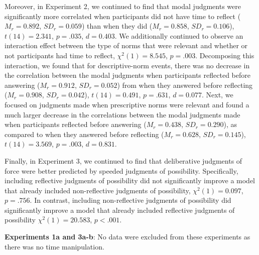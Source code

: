 \documentclass[11pt,letterpaper]{article}
\begin{document}
Moreover, in Experiment 2, we continued to find that modal judgments were significantly more correlated when participants did not have time to reflect ($M_{r} = 0.892$, $SD_{r} = 0.059$) than when they did ($M_{r} = 0.858$, $SD_{r} = 0.106$), $t(14) = 2.341$, $p  = .035$, $d = 0.403$. We additionally continued to observe an interaction effect between the type of norms that were relevant and whether or not participants had time to reflect, $\chi^2(1) = 8.545$, $p = .003$. Decomposing this interaction, we found that for descriptive-norm events, there was no decrease in the correlation between the modal judgments when participants reflected before answering ($M_{r} = 0.912$, $SD_{r} = 0.052$) from when they answered before reflecting ($M_{r} = 0.908$, $SD_{r} = 0.042$), $t(14) = 0.491$, $p  = .631$, $d = 0.077$. Next, we focused on judgments made when prescriptive norms were relevant and found a much larger decrease in the correlations between the modal judgments made when participants reflected before answering ($M_{r} = 0.438$, $SD_{r} = 0.290$), as compared to when they answered before reflecting ($M_{r} = 0.628$, $SD_{r} = 0.145$), $t(14) = 3.569$, $p  = .003$, $d = 0.831$.

Finally, in Experiment 3, we continued to find that deliberative judgments of force were better predicted by speeded judgments of possibility. Specifically, including reflective judgments of possibility did not significantly improve a model that already included non-reflective judgments of possibility, $\chi^2(1) = 0.097$, $p = .756$. In contrast, including non-reflective judgments of possibility did significantly improve a model that already included reflective judgments of possibility $\chi^2(1) = 20.583$, $p < .001$.

\vspace{5mm}
\noindent \textbf{Experiments 1a and 3a-b}: No data were excluded from these experiments as there was no time manipulation.

\clearpage


   
\end{document}

